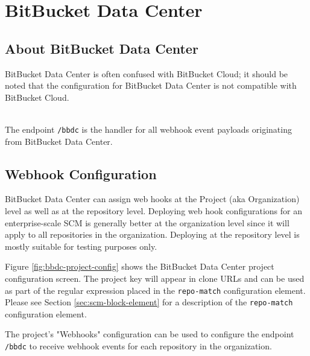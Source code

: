 \chapter{BitBucket Data Center}

\section{About BitBucket Data Center}

BitBucket Data Center is often confused with BitBucket Cloud; it should be noted that
the configuration for BitBucket Data Center is not compatible with BitBucket Cloud.

\noindent\\The \cxoneflow endpoint \texttt{/bbdc} is the handler for all webhook event
payloads originating from BitBucket Data Center.  


\section{Webhook Configuration}

BitBucket Data Center can assign web hooks at the Project (aka Organization) level as well as at the
repository level.  Deploying web hook configurations for an enterprise-scale SCM is generally better
at the organization level since it will apply to all repositories in the organization.  Deploying
at the repository level is mostly suitable for testing purposes only.

Figure \ref{fig:bbdc-project-config} shows the BitBucket Data Center project configuration screen.  The
project key will appear in clone URLs and can be used as part of the regular expression 
placed in the \texttt{repo-match} configuration element.  Please see Section \ref{sec:scm-block-element} 
for a description of the \texttt{repo-match} configuration element.

The project's "Webhooks" configuration can be used to configure the \cxoneflow endpoint 
\texttt{/bbdc} to receive webhook events for each repository in the organization.  

